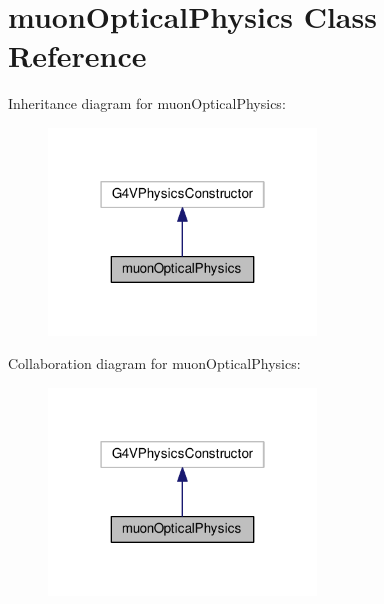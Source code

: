 \hypertarget{classmuonOpticalPhysics}{}\section{muon\+Optical\+Physics Class Reference}
\label{classmuonOpticalPhysics}


Inheritance diagram for muon\+Optical\+Physics\+:\nopagebreak
\begin{figure}[H]
\begin{center}
\leavevmode
\includegraphics[width=202pt]{classmuonOpticalPhysics__inherit__graph}
\end{center}
\end{figure}


Collaboration diagram for muon\+Optical\+Physics\+:\nopagebreak
\begin{figure}[H]
\begin{center}
\leavevmode
\includegraphics[width=202pt]{classmuonOpticalPhysics__coll__graph}
\end{center}
\end{figure}
